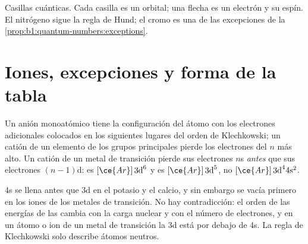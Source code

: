\begin{omfigure}

{\small Casillas cuánticas. Cada casilla es un orbital; una flecha es un
electrón y su espín. El nitrógeno sigue la regla de Hund; el cromo es una
de las excepciones de la \cref{prop:b1:quantum-numbers:exceptions}.}
\end{omfigure}

\section{Iones, excepciones y forma de la tabla}

\begin{proposition}\label{prop:b1:quantum-numbers:ions}
Un anión monoatómico tiene la configuración del átomo con los electrones
adicionales colocados en los siguientes lugares del orden de Klechkowski;
un catión de un elemento de los grupos principales pierde los electrones
del $n$ más alto. Un catión de un metal de transición pierde sus
electrones $n$s \emph{antes} que sus electrones
$(n-1)$d:  es $[\ce{Ar}]\,3\text{d}^6$ y
 es $[\ce{Ar}]\,3\text{d}^5$, no $[\ce{Ar}]\,3\text{d}^4
4\text{s}^2$.
\end{proposition}
\admitted

\begin{remark}\label{rem:b1:quantum-numbers:order}
4s se llena antes que 3d en el potasio y el calcio, y sin embargo se vacía
primero en los iones de los metales de transición. No hay contradicción:
el orden de las energías de las  cambia con la carga nuclear y con
el número de electrones, y en un átomo o ion de un metal de transición la
 3d está por debajo de 4s. La regla de Klechkowski solo describe
átomos neutros.
\end{remark}


